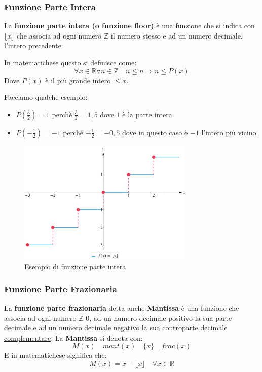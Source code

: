 \documentclass{article}
\theoremstyle{definition}
\begin{document}
\subsubsection{Funzione Parte Intera}\label{sec:funzione_parte_intera}
La \textbf{funzione parte intera (o funzione floor)} è una funzione che si indica con $ \lfloor x \rfloor $ che associa ad ogni numero $ \mathbb{Z} $  il numero stesso e ad un numero decimale, l'intero precedente. \par
In matematichese questo si definisce come:
\begin{equation*}
        \forall x \in \mathbb{R} \forall n \in \mathbb{Z} \quad n \le n \Rightarrow n \le P(x)
\end{equation*}
Dove $ P(x) $ è il più grande intero $ \le  x$. \par
Facciamo qualche esempio: 
\begin{itemize}
        \item $ P(\frac{3}{2}) = 1$ perchè $ \frac{3}{2} = 1,5 $ dove $ 1 $ è la parte intera.   
        \item $ P( - \frac{1}{2}) = -1$ perchè $ - \frac{1}{2} = -0,5 $ dove in questo caso è $ -1 $ l'intero più vicino. 
\end{itemize} 

\begin{figure}[h]
        \centering
                \includegraphics[width=0.75\textwidth]{esempio_funzione_parte_intera.png}
        \caption{Esempio di funzione parte intera}\label{fig:esempio_funzione_parte_intera}
\end{figure}



\subsubsection{Funzione Parte Frazionaria}\label{sec:funzione_parte_frazionaria}
La \textbf{funzione parte frazionaria} detta anche \textbf{Mantissa} è una funzione che associa ad ogni numero $ \mathbb{Z} $ 0, ad un numero decimale positivo la sua parte decimale e ad un numero decimale negativo la sua controparte decimale \underline{complementare}.
La \textbf{Mantissa} si denota con:
\begin{equation*}
        M(x) \quad mant(x) \quad \{x\} \quad frac(x) 
\end{equation*}
E in matematichese significa che:
\begin{equation*}
        M(x) = x - \lfloor x \rfloor \quad \forall x \in \mathbb{R}
\end{equation*}
\end{document}
